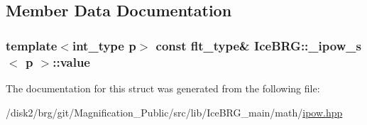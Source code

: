 \subsection{Member Data Documentation}
\hypertarget{structIceBRG_1_1__ipow__s_aadb90a28f1a59496d48dc4adef93c677}{}
\subsubsection[{value}]{\setlength{\rightskip}{0pt plus 5cm}template$<$int\+\_\+type p$>$ const {\bf flt\+\_\+type}\& {\bf Ice\+B\+R\+G\+::\+\_\+ipow\+\_\+s}$<$ p $>$\+::value}\label{structIceBRG_1_1__ipow__s_aadb90a28f1a59496d48dc4adef93c677}


The documentation for this struct was generated from the following file\+:\begin{DoxyCompactItemize}
\item 
/disk2/brg/git/\+Magnification\+\_\+\+Public/src/lib/\+Ice\+B\+R\+G\+\_\+main/math/\hyperlink{ipow_8hpp}{ipow.\+hpp}\end{DoxyCompactItemize}
